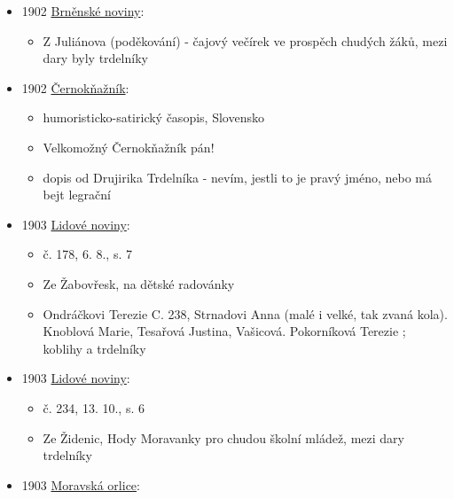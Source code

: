 \begin{itemize}
  \begin{itemize}
  \tightlist
  \item
    vyprávění kluka o tom, jak byl populární ve škole, když přinesl
    trdelník, co dostala jeho máma po narození bratra
  \end{itemize}
\item
  1902
  \href{https://ceskadigitalniknihovna.cz/view/uuid:b0836ae0-7a03-11e3-ae4b-001018b5eb5c?page=uuid\%3A5bf570c0-7bd1-11e3-ae4b-001018b5eb5c&fulltext=trdeln\%C3\%ADk\%20OR\%20trdeln\%C3\%ADky\%20OR\%20trdeln\%C3\%ADk\%C5\%AF&source=mzk}{Brněnské
  noviny}:

  \begin{itemize}
  \tightlist
  \item
    Z Juliánova (poděkování) - čajový večírek ve prospěch chudých žáků,
    mezi dary byly trdelníky
  \end{itemize}
\item
  1902
  \href{https://dikda.snk.sk/uuid/uuid:58996fdb-67e7-405a-a594-2f58269ee2bf}{Černokňažník}:

  \begin{itemize}
  \tightlist
  \item
    humoristicko-satirický časopis, Slovensko
  \item
    Velkomožný Černokňažník pán!
  \item
    dopis od Drujirika Trdelníka - nevím, jestli to je pravý jméno, nebo
    má bejt legrační
  \end{itemize}
\item
  1903
  \href{https://www.digitalniknihovna.cz/vkol/uuid/uuid:b79f68db-435d-11dd-b505-00145e5790ea}{Lidové
  noviny}:

  \begin{itemize}
  \tightlist
  \item
    č. 178, 6. 8., s. 7
  \item
    Ze Žabovřesk, na dětské radovánky
  \item
    Ondráčkovi Terezie C. 238, Strnadovi Anna (malé i velké, tak zvaná
    kola). Knoblová Marie, Tesařová Justina, Vašicová. Pokorníková
    Terezie ; koblihy a trdelníky
  \end{itemize}
\item
  1903
  \href{https://www.digitalniknihovna.cz/vkol/uuid/uuid:b799eafc-435d-11dd-b505-00145e5790ea}{Lidové
  noviny}:

  \begin{itemize}
  \tightlist
  \item
    č. 234, 13. 10., s. 6
  \item
    Ze Židenic, Hody Moravanky pro chudou školní mládež, mezi dary
    trdelníky
  \end{itemize}
\item
  1903
  \href{https://www.digitalniknihovna.cz/mzk/uuid/uuid:d2f26490-0a4b-11df-b073-000d606f5dc6}{Moravská
  orlice}:


\end{itemize}

